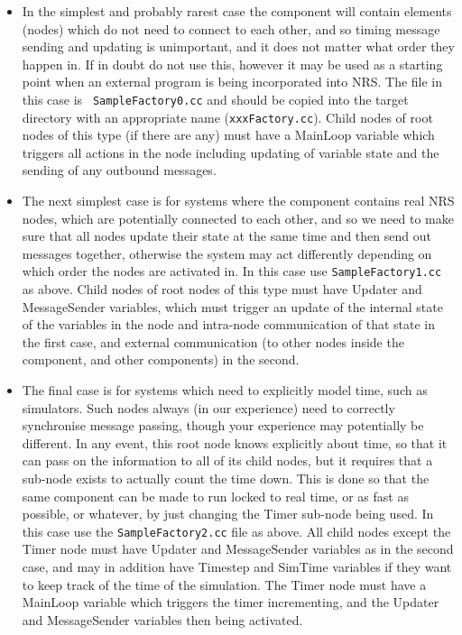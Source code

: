 \documentclass[pdftex,a4paper]{article}
\begin{document}
\begin{itemize}

\item In the simplest and probably rarest case the component will
contain elements (nodes) which do not need to connect to each other,
and so timing message sending and updating is unimportant, and it does
not matter what order they happen in. If in doubt do not use this,
however it may be used as a starting point when an external program is
being incorporated into NRS. The file in this case is {\tt
SampleFactory0.cc} and should be copied into the target directory with
an appropriate name ({\tt xxxFactory.cc}). Child nodes of root nodes
of this type (if there are any) must have a MainLoop variable which
triggers all actions in the node including updating of variable state
and the sending of any outbound messages.

\item The next simplest case is for systems where the component
contains real NRS nodes, which are potentially connected to each
other, and so we need to make sure that all nodes update their state
at the same time and then send out messages together, otherwise the
system may act differently depending on which order the nodes are
activated in. In this case use {\tt SampleFactory1.cc} as above. Child
nodes of root nodes of this type must have Updater and MessageSender
variables, which must trigger an update of the internal state of the
variables in the node and intra-node communication of that state in
the first case, and external communication (to other nodes inside the
component, and other components) in the second.

\item The final case is for systems which need to explicitly model
time, such as simulators. Such nodes always (in our experience) need
to correctly synchronise message passing, though your experience may
potentially be different. In any event, this root node knows
explicitly about time, so that it can pass on the information to all
of its child nodes, but it requires that a sub-node exists to actually
count the time down. This is done so that the same component can be
made to run locked to real time, or as fast as possible, or whatever,
by just changing the Timer sub-node being used. In this case use the
{\tt SampleFactory2.cc} file as above. All child nodes except the
Timer node must have Updater and MessageSender variables as in the
second case, and may in addition have Timestep and SimTime variables
if they want to keep track of the time of the simulation. The Timer
node must have a MainLoop variable which triggers the timer
incrementing, and the Updater and MessageSender variables then being
activated.

\end{itemize}
\end{document}
